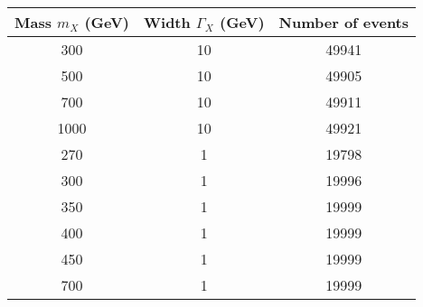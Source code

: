 \begin{tabular}{c | c | c}
Mass $m_X$ (GeV) & Width $\Gamma_X$ (GeV) & Number of events \\ \hline
300 & 10 & 49941 \\
500 & 10 & 49905 \\
700 & 10 & 49911 \\
1000& 10 & 49921 \\\hline
270 &  1 & 19798 \\
300 &  1 & 19996 \\
350 &  1 & 19999 \\
400 &  1 & 19999 \\
450 &  1 & 19999 \\
700 &  1 & 19999 \\
\end{tabular}
